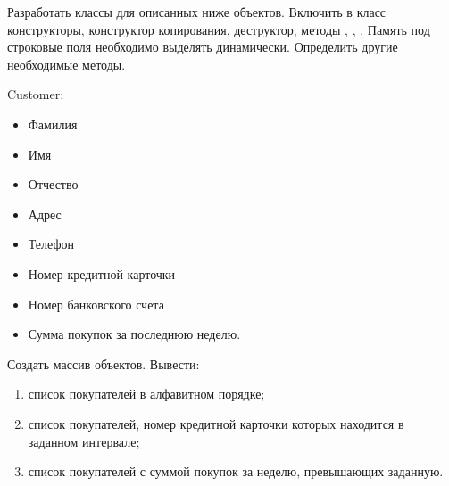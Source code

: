 
Разработать классы для описанных ниже объектов. Включить в класс
конструкторы, конструктор копирования, деструктор, методы ,
, . Память под строковые поля необходимо выделять
динамически. Определить другие необходимые методы.

Customer:
\begin{itemize}
	\item Фамилия
	\item Имя
	\item Отчество
	\item Адрес
	\item Телефон
	\item Номер кредитной карточки
	\item Номер банковского счета
	\item Сумма покупок за последнюю неделю.
\end{itemize}

Создать массив объектов. Вывести:
\begin{enumerate}
	\item список покупателей в алфавитном порядке;
	\item список покупателей, номер кредитной карточки которых находится в заданном интервале;
	\item список покупателей с суммой покупок за неделю, превышающих заданную.
\end{enumerate}

